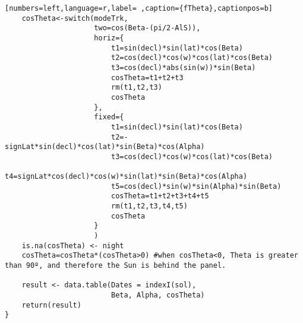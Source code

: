 \begin{lstlisting}[numbers=left,language=r,label= ,caption={fTheta},captionpos=b]
    cosTheta<-switch(modeTrk,
                     two=cos(Beta-(pi/2-AlS)),
                     horiz={
                         t1=sin(decl)*sin(lat)*cos(Beta)      
                         t2=cos(decl)*cos(w)*cos(lat)*cos(Beta)   
                         t3=cos(decl)*abs(sin(w))*sin(Beta)   
                         cosTheta=t1+t2+t3
                         rm(t1,t2,t3)
                         cosTheta
                     },
                     fixed={
                         t1=sin(decl)*sin(lat)*cos(Beta)      
                         t2=-signLat*sin(decl)*cos(lat)*sin(Beta)*cos(Alpha) 
                         t3=cos(decl)*cos(w)*cos(lat)*cos(Beta)   
                         t4=signLat*cos(decl)*cos(w)*sin(lat)*sin(Beta)*cos(Alpha) 
                         t5=cos(decl)*sin(w)*sin(Alpha)*sin(Beta)   
                         cosTheta=t1+t2+t3+t4+t5
                         rm(t1,t2,t3,t4,t5)
                         cosTheta
                     }
                     )
    is.na(cosTheta) <- night
    cosTheta=cosTheta*(cosTheta>0) #when cosTheta<0, Theta is greater than 90º, and therefore the Sun is behind the panel.

    result <- data.table(Dates = indexI(sol),
                         Beta, Alpha, cosTheta)
    return(result)
}
\end{lstlisting}
